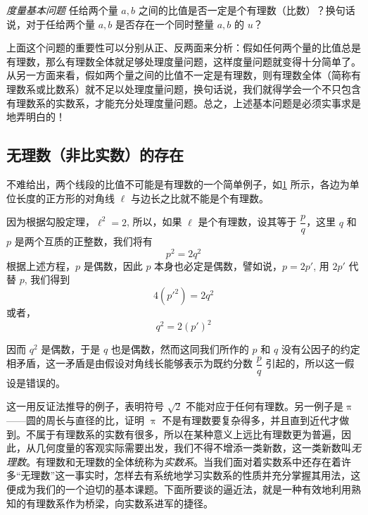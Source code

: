 \bigskip
\emph{度量基本问题 } 任给两个量 $a,b$ 之间的比值是否一定是个有理数（比数）？换句话说，对于任给两个量 $a,b$ 是否存在一个同时整量 $a,b$ 的 $u$？

上面这个问题的重要性可以分别从正、反两面来分析：假如任何两个量的比值总是有理数，那么有理数全体就足够处理度量问题，这样度量问题就变得十分简单了。从另一方面来看，假如两个量之间的比值不一定是有理数，则有理数全体（简称有理数系或比数系）就不足以处理度量问题，换句话说，我们就得学会一个不只包含有理数系的实数系，才能充分处理度量问题。总之，上述基本问题是必须实事求是地弄明白的！

\subsection{无理数（非比实数）的存在}
不难给出，两个线段的比值不可能是有理数的一个简单例子，如\cref{fig:irrationalnumber} 所示，各边为单位长度的正方形的对角线 $\ell$ 与边长之比就不能是个有理数。
\begin{figure}
\caption{}\label{fig:irrationalnumber}
\end{figure}

因为根据勾股定理，$\ell^2=2$, 所以，如果 $\ell$ 是个有理数，设其等于 $\dfrac{p}{q}$，这里 $q$ 和 $p$ 是两个互质的正整数，我们将有
\[p^2=2q^2\]
根据上述方程，$p$ 是偶数，因此 $p$ 本身也必定是偶数，譬如说，$p=2p'$, 用 $2p'$ 代替 $p$, 我们得到
\[4({p'}^2)=2q^2\]
或者，
\[q^2=2(p')^2\]
{\linespread{1.6}\selectfont
因而 $q^2$ 是偶数，于是 $q$ 也是偶数，然而这同我们所作的 $p$ 和 $q$ 没有公因子的约定相矛盾，这一矛盾是由假设对角线长能够表示为既约分数 $\dfrac{p}{q}$ 引起的，所以这一假设是错误的。\par}

这一用反证法推导的例子，表明符号 $\sqrt{2}$ 不能对应于任何有理数。另一例子是$\uppi$ ——圆的周长与直径的比，证明 $\uppi$ 不是有理数要复杂得多，并且直到近代才做到。不属于有理数系的实数有很多，所以在某种意义上远比有理数更为普遍，因此，从几何度量的客观实际需要出发，我们不得不增添一类新数，这一类新数叫\emph{无理数}。有理数和无理数的全体统称为\emph{实数系}。当我们面对着实数系中还存在着许多“无理数”这一事实时，怎样去有系统地学习实数系的性质并充分掌握其用法，这便成为我们的一个迫切的基本课题。下面所要谈的逼近法，就是一种有效地利用熟知的有理数系作为桥梁，向实数系进军的捷径。

